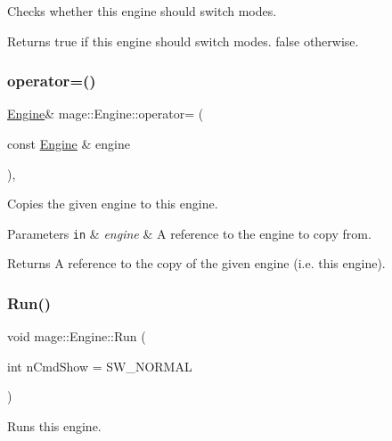 Checks whether this engine should switch modes.

\begin{DoxyReturn}{Returns}
{\ttfamily true} if this engine should switch modes. {\ttfamily false} otherwise. 
\end{DoxyReturn}
\hypertarget{classmage_1_1_engine_a1eedff82d4c8207c61676230520648fd}{}\label{classmage_1_1_engine_a1eedff82d4c8207c61676230520648fd} 
\subsubsection{\texorpdfstring{operator=()}{operator=()}}
{\footnotesize\ttfamily \hyperlink{classmage_1_1_engine}{Engine}\& mage\+::\+Engine\+::operator= (\begin{DoxyParamCaption}\item[{const \hyperlink{classmage_1_1_engine}{Engine} \&}]{engine }\end{DoxyParamCaption})\hspace{0.3cm}{\ttfamily [private]}, {\ttfamily [delete]}}

Copies the given engine to this engine.


\begin{DoxyParams}[1]{Parameters}
\mbox{\tt in}  & {\em engine} & A reference to the engine to copy from. \\
\hline
\end{DoxyParams}
\begin{DoxyReturn}{Returns}
A reference to the copy of the given engine (i.\+e. this engine). 
\end{DoxyReturn}
\hypertarget{classmage_1_1_engine_a246c82d0e55bc29e73aecbc365464ec8}{}\label{classmage_1_1_engine_a246c82d0e55bc29e73aecbc365464ec8} 
\subsubsection{\texorpdfstring{Run()}{Run()}}
{\footnotesize\ttfamily void mage\+::\+Engine\+::\+Run (\begin{DoxyParamCaption}\item[{int}]{n\+Cmd\+Show = {\ttfamily SW\+\_\+NORMAL} }\end{DoxyParamCaption})}

Runs this engine.


